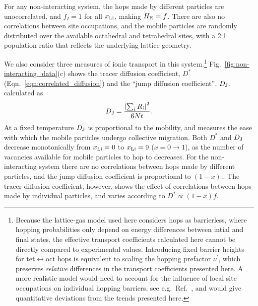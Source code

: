 \documentclass[aps,prb,twocolumn,superscriptaddress,reprint]{revtex4-1}
\newcommand{\xLi}{x_\m{Li}}
\begin{document}
For any non-interacting system, the hops made by different particles are unocorrelated, and $f_I=1$ for all $\xLi$, making $H_{\mathrm{R}}=f$. 
There are also no correlations between site occupations, and the mobile particles are randomly distributed over the available octahedral and tetrahedral sites, with a 2:1 population ratio that reflects the underlying lattice geometry.

We also consider three measures of ionic transport in this system.\footnote{Because the lattice-gas model used here considers hops as barrierless, where hopping probabilities only depend on  energy differences between intial and final states, the effective transport coefficients calculated here cannot be directly compared to experimental values. 
Introducing fixed barrier heights for tet$\leftrightarrow$oct hops is equivalent to scaling the hopping prefactor $\nu^\prime$, which preserves \emph{relative} differences in the transport coefficients presented here. 
A more realistic model would need to account for the influence of local site occupations on individual hopping barriers, see e.g.\ Ref.\ \cite{VanderVenAndCeder_HandbookofMaterialsModelling2010}, and would give quantitative deviations from the trends presented here.} Fig.~\ref{fig:non-interacting_data}(c) shows the tracer diffusion coefficient, $D^*$ (Eqn.~\ref{eqn:correlated_diffusion}) and the ``jump diffusion coefficient'', $D_{\mathrm{J}}$,\cite{VanDerVenEtAl_AccChemRes2013} calculated as
\begin{equation}
  D_{\mathrm{J}}=\frac{\left|\sum_iR_i\right|^2}{6Nt}.
\end{equation}
At a fixed temperature $D_{\mathrm{J}}$ is proportional to the mobility, and measures the ease with which the mobile particles undergo collective migration. 
Both $D^*$ and $D_{\mathrm{J}}$ decrease monotonically from $\xLi=0$ to $\xLi=9$ ($x=0\to1$), as the number of vacancies available for mobile particles to hop to decreases. 
For the non-interacting system there are no correlations between hops made by different particles, and the jump diffusion coefficient is proportional to $(1-x)$.\cite{Kutner_PhysLett1981,VanDerVenEtAl_AccChemRes2013}. 
The tracer diffusion coefficient, however, shows the effect of correlations between hops made by individual particles, and varies according to $D^*\propto(1-x)f$. 
\end{document}
